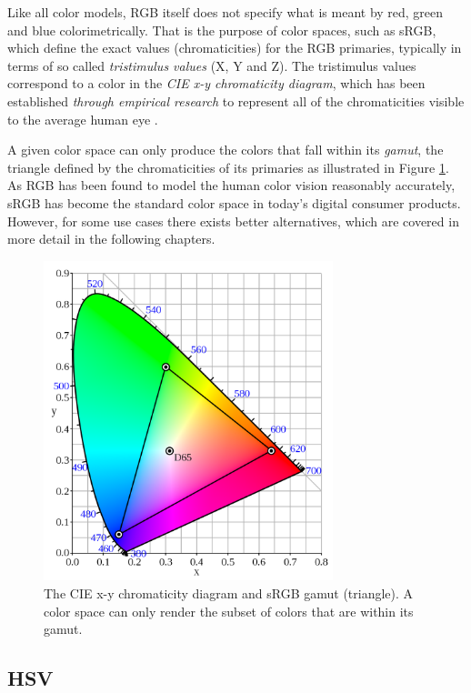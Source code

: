 \documentclass[thesis.tex]{subfiles}
\begin{document}
Like all color models, RGB itself does not specify what is meant by red, green and blue colorimetrically. That is the purpose of color spaces, such as sRGB, which define the exact values (chromaticities) for the RGB primaries, typically in terms of so called \textit{tristimulus values} (X, Y and Z). The tristimulus values correspond to a color in the \textit{CIE x-y chromaticity diagram}, which has been established \emph{through empirical research} to represent all of the chromaticities visible to the average human eye \cite{cie}.

A given color space can only produce the colors that fall within its \textit{gamut}, the triangle defined by the chromaticities of its primaries as illustrated in Figure \ref{figure:srgb}. As RGB has been found to model the human color vision reasonably accurately, sRGB has become the standard color space in today's digital consumer products. However, for some use cases there exists better alternatives, which are covered in more detail in the following chapters.

\clearpage
\begin{figure}[ht]
\centering \includegraphics[width=0.75\textwidth]{images/srgb}
\caption{The CIE x-y chromaticity diagram and sRGB gamut (triangle). A color space can only render the subset of colors that are within its gamut.\label{figure:srgb}}
\end{figure}

\subsection{HSV}
\end{document}
